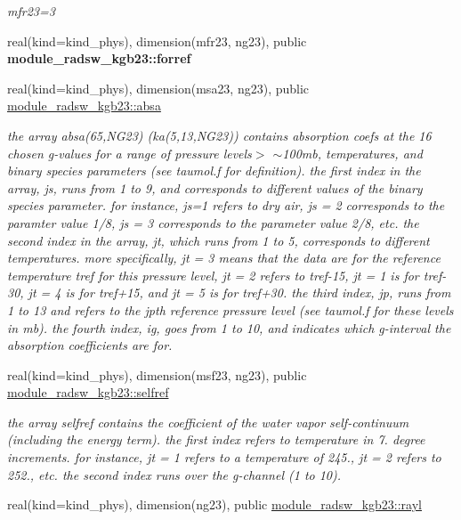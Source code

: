 \begin{Indent}
\begin{DoxyCompactItemize}
\begin{DoxyCompactList}\small\item\em mfr23=3 \end{DoxyCompactList}\item 
real(kind=kind\+\_\+phys), dimension(mfr23, ng23), public {\bfseries module\+\_\+radsw\+\_\+kgb23\+::forref}
\item 
real(kind=kind\+\_\+phys), dimension(msa23, ng23), public \hyperlink{group__module__radsw__kgbnn_ga2541e41c7d445a2ce73283e2fb76270c}{module\+\_\+radsw\+\_\+kgb23\+::absa}
\begin{DoxyCompactList}\small\item\em the array absa(65,\+N\+G23) (ka(5,13,\+N\+G23)) contains absorption coefs at the 16 chosen g-\/values for a range of pressure levels$>$ $\sim$100mb, temperatures, and binary species parameters (see taumol.\+f for definition). the first index in the array, js, runs from 1 to 9, and corresponds to different values of the binary species parameter. for instance, js=1 refers to dry air, js = 2 corresponds to the paramter value 1/8, js = 3 corresponds to the parameter value 2/8, etc. the second index in the array, jt, which runs from 1 to 5, corresponds to different temperatures. more specifically, jt = 3 means that the data are for the reference temperature tref for this pressure level, jt = 2 refers to tref-\/15, jt = 1 is for tref-\/30, jt = 4 is for tref+15, and jt = 5 is for tref+30. the third index, jp, runs from 1 to 13 and refers to the jpth reference pressure level (see taumol.\+f for these levels in mb). the fourth index, ig, goes from 1 to 10, and indicates which g-\/interval the absorption coefficients are for. \end{DoxyCompactList}\item 
real(kind=kind\+\_\+phys), dimension(msf23, ng23), public \hyperlink{group__module__radsw__kgbnn_gae4e51bcb3c3cbaaf1476d5ab18b072e5}{module\+\_\+radsw\+\_\+kgb23\+::selfref}
\begin{DoxyCompactList}\small\item\em the array selfref contains the coefficient of the water vapor self-\/continuum (including the energy term). the first index refers to temperature in 7. degree increments. for instance, jt = 1 refers to a temperature of 245., jt = 2 refers to 252., etc. the second index runs over the g-\/channel (1 to 10). \end{DoxyCompactList}\item 
real(kind=kind\+\_\+phys), dimension(ng23), public \hyperlink{group__module__radsw__kgbnn_ga40006f284543c7347eced417b9de2fc6}{module\+\_\+radsw\+\_\+kgb23\+::rayl}

\end{DoxyCompactItemize}
\end{Indent}
